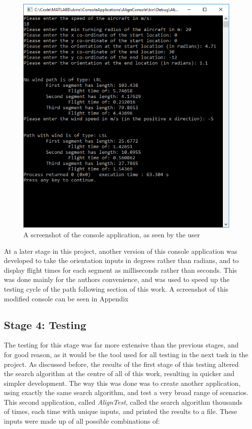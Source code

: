 \begin{figure}%
\centering    
\includegraphics[width=\textwidth]{Console_Demo}
\caption[Screenshot of the finalised console application]{A screenshot of the console application, as seen by the user}
\label{fig:consoledemo}
\end{figure}

At a later stage in this project, another version of this console application was developed to take the orientation inputs in degrees rather than radians, and to display flight times for each segment as milliseconds rather than seconds. This was done mainly for the authors convenience, and was used to speed up the testing cycle of the path following section of this work. A screenshot of this modified console can be seen in Appendix %

\subsection{Stage 4: Testing}
\label{task1:stage4:testing}

The testing for this stage was far more extensive than the previous stages, and for good reason, as it would be the tool used for all testing in the next task in the project. As discussed before, the results of the first stage of this testing altered the search algorithm at the centre of all of this work, resulting in quicker and simpler development. The way this was done was to create another application, using exactly the same search algorithm, and test a very broad range of scenarios. This second application, called \textit{AlignTest}, called the search algorithm thousands of times, each time with unique inputs, and printed the results to a file. These inputs were made up of all possible combinations of:

